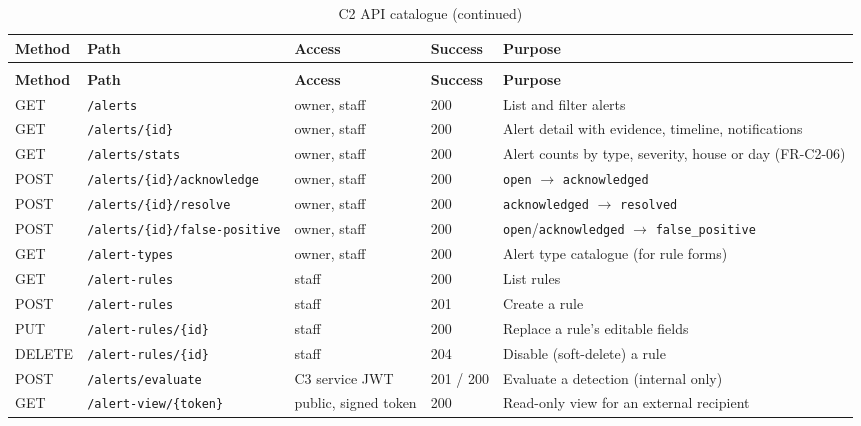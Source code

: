 \begin{longtable}{L{1.3cm}L{4.4cm}L{3.2cm}L{1.3cm}L{4.4cm}}
\caption{C2 API catalogue}\label{tab:c2-catalogue}\\
\toprule
\textbf{Method} & \textbf{Path} & \textbf{Access} & \textbf{Success} & \textbf{Purpose} \\
\midrule
\endfirsthead
\caption[]{C2 API catalogue (continued)}\\
\toprule
\textbf{Method} & \textbf{Path} & \textbf{Access} & \textbf{Success} & \textbf{Purpose} \\
\midrule
\endhead
GET & \texttt{/alerts} & owner, staff & 200 & List and filter alerts \\
GET & \texttt{/alerts/\{id\}} & owner, staff & 200 & Alert detail with evidence, timeline, notifications \\
GET & \texttt{/alerts/stats} & owner, staff & 200 & Alert counts by type, severity, house or day (FR-C2-06) \\
POST & \texttt{/alerts/\{id\}/acknowledge} & owner, staff & 200 & \texttt{open} $\rightarrow$ \texttt{acknowledged} \\
POST & \texttt{/alerts/\{id\}/resolve} & owner, staff & 200 & \texttt{acknowledged} $\rightarrow$ \texttt{resolved} \\
POST & \texttt{/alerts/\{id\}/false-positive} & owner, staff & 200 & \texttt{open}/\texttt{acknowledged} $\rightarrow$ \texttt{false\_positive} \\
GET & \texttt{/alert-types} & owner, staff & 200 & Alert type catalogue (for rule forms) \\
GET & \texttt{/alert-rules} & staff & 200 & List rules \\
POST & \texttt{/alert-rules} & staff & 201 & Create a rule \\
PUT & \texttt{/alert-rules/\{id\}} & staff & 200 & Replace a rule's editable fields \\
DELETE & \texttt{/alert-rules/\{id\}} & staff & 204 & Disable (soft-delete) a rule \\
POST & \texttt{/alerts/evaluate} & C3 service JWT & 201 / 200 & Evaluate a detection (internal only) \\
GET & \texttt{/alert-view/\{token\}} & public, signed token & 200 & Read-only view for an external recipient \\
\bottomrule
\end{longtable}

